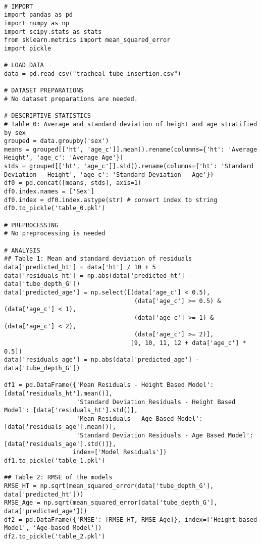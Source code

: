 \documentclass[11pt]{article}
\begin{document}
\begin{verbatim}

# IMPORT
import pandas as pd
import numpy as np
import scipy.stats as stats
from sklearn.metrics import mean_squared_error
import pickle

# LOAD DATA
data = pd.read_csv("tracheal_tube_insertion.csv")

# DATASET PREPARATIONS
# No dataset preparations are needed.

# DESCRIPTIVE STATISTICS
# Table 0: Average and standard deviation of height and age stratified by sex
grouped = data.groupby('sex')
means = grouped[['ht', 'age_c']].mean().rename(columns={'ht': 'Average Height', 'age_c': 'Average Age'})
stds = grouped[['ht', 'age_c']].std().rename(columns={'ht': 'Standard Deviation - Height', 'age_c': 'Standard Deviation - Age'})
df0 = pd.concat([means, stds], axis=1)
df0.index.names = ['Sex']
df0.index = df0.index.astype(str) # convert index to string
df0.to_pickle('table_0.pkl')

# PREPROCESSING
# No preprocessing is needed

# ANALYSIS
## Table 1: Mean and standard deviation of residuals 
data['predicted_ht'] = data['ht'] / 10 + 5
data['residuals_ht'] = np.abs(data['predicted_ht'] - data['tube_depth_G'])
data['predicted_age'] = np.select([(data['age_c'] < 0.5), 
                                    (data['age_c'] >= 0.5) & (data['age_c'] < 1),
                                    (data['age_c'] >= 1) & (data['age_c'] < 2),
                                    (data['age_c'] >= 2)],
                                   [9, 10, 11, 12 + data['age_c'] * 0.5])
data['residuals_age'] = np.abs(data['predicted_age'] - data['tube_depth_G'])

df1 = pd.DataFrame({'Mean Residuals - Height Based Model': [data['residuals_ht'].mean()], 
                    'Standard Deviation Residuals - Height Based Model': [data['residuals_ht'].std()], 
                    'Mean Residuals - Age Based Model': [data['residuals_age'].mean()], 
                    'Standard Deviation Residuals - Age Based Model': [data['residuals_age'].std()]},
                   index=['Model Residuals'])
df1.to_pickle('table_1.pkl')

## Table 2: RMSE of the models
RMSE_HT = np.sqrt(mean_squared_error(data['tube_depth_G'], data['predicted_ht']))
RMSE_Age = np.sqrt(mean_squared_error(data['tube_depth_G'], data['predicted_age']))
df2 = pd.DataFrame({'RMSE': [RMSE_HT, RMSE_Age]}, index=['Height-based Model', 'Age-based Model'])
df2.to_pickle('table_2.pkl')


\end{verbatim}
\end{document}
